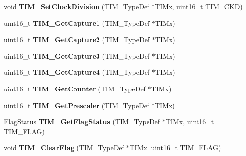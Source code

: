 \begin{DoxyCompactItemize}
\item 
\hypertarget{group__TIM__Exported__Functions_ga20ef804dc32c723662d11ee7da3baab2}{
void {\bfseries TIM\_\-SetClockDivision} (TIM\_\-TypeDef $\ast$TIMx, uint16\_\-t TIM\_\-CKD)}
\label{group__TIM__Exported__Functions_ga20ef804dc32c723662d11ee7da3baab2}

\item 
\hypertarget{group__TIM__Exported__Functions_ga29eb9f7151ceea94c3988539a5ee91cf}{
uint16\_\-t {\bfseries TIM\_\-GetCapture1} (TIM\_\-TypeDef $\ast$TIMx)}
\label{group__TIM__Exported__Functions_ga29eb9f7151ceea94c3988539a5ee91cf}

\item 
\hypertarget{group__TIM__Exported__Functions_ga437fcf00ee9d0a9df9150cc120efc5ad}{
uint16\_\-t {\bfseries TIM\_\-GetCapture2} (TIM\_\-TypeDef $\ast$TIMx)}
\label{group__TIM__Exported__Functions_ga437fcf00ee9d0a9df9150cc120efc5ad}

\item 
\hypertarget{group__TIM__Exported__Functions_gab71d1d3d8a15f3be9e74dca51fcca5fa}{
uint16\_\-t {\bfseries TIM\_\-GetCapture3} (TIM\_\-TypeDef $\ast$TIMx)}
\label{group__TIM__Exported__Functions_gab71d1d3d8a15f3be9e74dca51fcca5fa}

\item 
\hypertarget{group__TIM__Exported__Functions_ga09049af04c8345849c6f82ccfae242a6}{
uint16\_\-t {\bfseries TIM\_\-GetCapture4} (TIM\_\-TypeDef $\ast$TIMx)}
\label{group__TIM__Exported__Functions_ga09049af04c8345849c6f82ccfae242a6}

\item 
\hypertarget{group__TIM__Exported__Functions_gab6826b144ae70e206f51ae8af5318a93}{
uint16\_\-t {\bfseries TIM\_\-GetCounter} (TIM\_\-TypeDef $\ast$TIMx)}
\label{group__TIM__Exported__Functions_gab6826b144ae70e206f51ae8af5318a93}

\item 
\hypertarget{group__TIM__Exported__Functions_ga427eb6e533480e02a27cd0ca876183d6}{
uint16\_\-t {\bfseries TIM\_\-GetPrescaler} (TIM\_\-TypeDef $\ast$TIMx)}
\label{group__TIM__Exported__Functions_ga427eb6e533480e02a27cd0ca876183d6}

\item 
\hypertarget{group__TIM__Exported__Functions_ga0adcbbd5e838ec8642e7a9b80075f41f}{
FlagStatus {\bfseries TIM\_\-GetFlagStatus} (TIM\_\-TypeDef $\ast$TIMx, uint16\_\-t TIM\_\-FLAG)}
\label{group__TIM__Exported__Functions_ga0adcbbd5e838ec8642e7a9b80075f41f}

\item 
\hypertarget{group__TIM__Exported__Functions_ga46568c7b254941dc53e785342d60baf3}{
void {\bfseries TIM\_\-ClearFlag} (TIM\_\-TypeDef $\ast$TIMx, uint16\_\-t TIM\_\-FLAG)}
\label{group__TIM__Exported__Functions_ga46568c7b254941dc53e785342d60baf3}


\end{DoxyCompactItemize}
